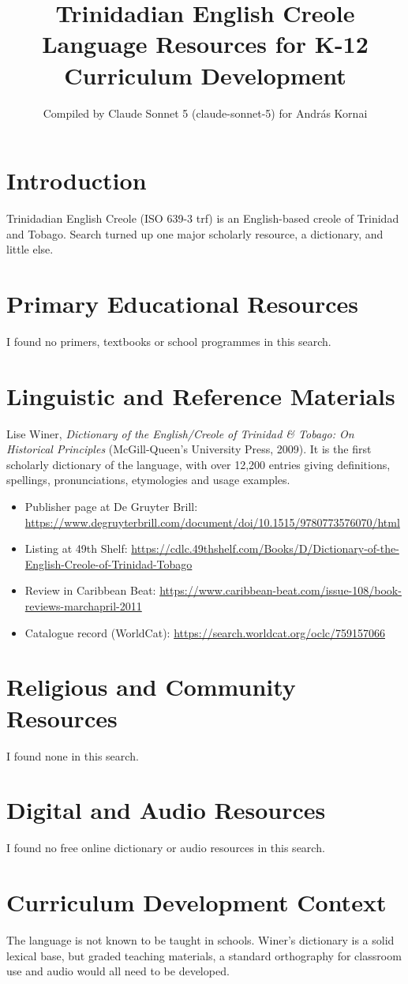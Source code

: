 \documentclass[12pt]{article}
\title{Trinidadian English Creole Language Resources for K-12 Curriculum Development}
\author{Compiled by Claude Sonnet 5 (claude-sonnet-5) for Andr\'as Kornai}
\date{}
\begin{document}
\maketitle
\section{Introduction}
Trinidadian English Creole (ISO 639-3 trf) is an English-based creole of Trinidad and Tobago. Search turned up one major scholarly resource, a dictionary, and little else.
\section{Primary Educational Resources}
I found no primers, textbooks or school programmes in this search.
\section{Linguistic and Reference Materials}
Lise Winer, \emph{Dictionary of the English/Creole of Trinidad \& Tobago: On Historical Principles} (McGill-Queen's University Press, 2009). It is the first scholarly dictionary of the language, with over 12,200 entries giving definitions, spellings, pronunciations, etymologies and usage examples.
\begin{itemize}
\item Publisher page at De Gruyter Brill: \url{https://www.degruyterbrill.com/document/doi/10.1515/9780773576070/html}
\item Listing at 49th Shelf: \url{https://cdlc.49thshelf.com/Books/D/Dictionary-of-the-English-Creole-of-Trinidad-Tobago}
\item Review in Caribbean Beat: \url{https://www.caribbean-beat.com/issue-108/book-reviews-marchapril-2011}
\item Catalogue record (WorldCat): \url{https://search.worldcat.org/oclc/759157066}
\end{itemize}
\section{Religious and Community Resources}
I found none in this search.
\section{Digital and Audio Resources}
I found no free online dictionary or audio resources in this search.
\section{Curriculum Development Context}
The language is not known to be taught in schools. Winer's dictionary is a solid lexical base, but graded teaching materials, a standard orthography for classroom use and audio would all need to be developed.
\end{document}
